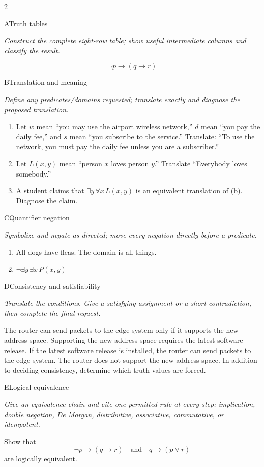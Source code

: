 \documentclass[9pt]{extarticle}
\begin{document}
\begin{multicols}{2}
\begin{CoreProblem}{A}{Truth tables}
{\scriptsize\textit{Construct the complete eight-row table; show useful intermediate columns and classify the result.}\par}
\[
  \neg p\to(q\to r)
\]
\end{CoreProblem}
\begin{CoreProblem}{B}{Translation and meaning}
{\scriptsize\textit{Define any predicates/domains requested; translate exactly and diagnose the proposed translation.}\par}
\begin{enumerate}[label=(\alph*)]
  \item Let $w$ mean ``you may use the airport wireless network,'' $d$ mean
        ``you pay the daily fee,'' and $s$ mean ``you subscribe to the
        service.'' Translate: ``To use the network, you must pay the daily fee
        unless you are a subscriber.''
  \item Let $L(x,y)$ mean ``person $x$ loves person $y$.'' Translate
        ``Everybody loves somebody.''
  \item A student claims that $\exists y\,\forall x\,L(x,y)$ is an equivalent
        translation of (b). Diagnose the claim.
\end{enumerate}
\end{CoreProblem}
\begin{CoreProblem}{C}{Quantifier negation}
{\scriptsize\textit{Symbolize and negate as directed; move every negation directly before a predicate.}\par}
\begin{enumerate}[label=(\alph*)]
  \item All dogs have fleas. The domain is all things.
  \item $\neg\exists y\,\exists x\,P(x,y)$
\end{enumerate}
\end{CoreProblem}
\columnbreak
\begin{CoreProblem}{D}{Consistency and satisfiability}
{\scriptsize\textit{Translate the conditions. Give a satisfying assignment or a short contradiction, then complete the final request.}\par}
The router can send packets to the edge system only if it supports the new
address space. Supporting the new address space requires the latest software
release. If the latest software release is installed, the router can send
packets to the edge system. The router does not support the new address space.
In addition to deciding consistency, determine which truth values are forced.
\end{CoreProblem}
\begin{CoreProblem}{E}{Logical equivalence}
{\scriptsize\textit{Give an equivalence chain and cite one permitted rule at every step: implication, double negation, De Morgan, distributive, associative, commutative, or idempotent.}\par}
Show that
\[
  \neg p\to(q\to r)
  \quad\text{and}\quad
  q\to(p\lor r)
\]
are logically equivalent.
\end{CoreProblem}
\end{multicols}
\end{document}
